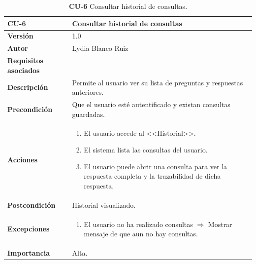 \begin{table}[p]
	\centering
	\begin{tabularx}{\linewidth}{ p{} p{} }
		\toprule
		\textbf{\textbf{CU-6}}    & \textbf{Consultar historial de consultas}\\
		\toprule
		\textbf{Versión}              & 1.0    \\
		\textbf{Autor}                & Lydia Blanco Ruiz \\
		\textbf{Requisitos asociados} & {RF-11.1} \\
		\textbf{Descripción}          & Permite al usuario ver su lista de preguntas y respuestas anteriores. \\
		\textbf{Precondición}         & Que el usuario esté autentificado y existan consultas guardadas. \\
		\textbf{Acciones}             &
		\begin{enumerate}
			\def\labelenumi{\arabic{enumi}.}
			\tightlist
			\item El usuario accede al <<Historial>>.
			\item El sistema lista las consultas del usuario.
			\item El usuario puede abrir una consulta para ver la respuesta completa y la trazabilidad de dicha respuesta.
		\end{enumerate}\\
		\textbf{Postcondición}        & Historial visualizado. \\
		\textbf{Excepciones}          & 
		\begin{enumerate}
			\def\labelenumi{\arabic{enumi}.}
			\tightlist
			\item El usuario no ha realizado consultas $\Rightarrow$ Mostrar mensaje de que aun no hay consultas. 	
		\end{enumerate}\\
		\textbf{Importancia}          & Alta.  \\
		\bottomrule
	\end{tabularx}
	\caption{\textbf{CU-6} Consultar historial de consultas.}
	\label{req-06}
\end{table}

